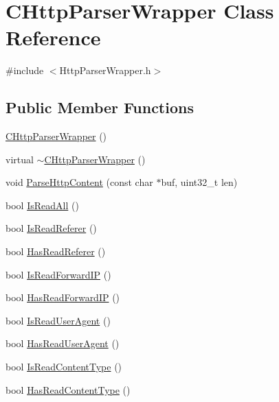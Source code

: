 \hypertarget{class_c_http_parser_wrapper}{}\section{C\+Http\+Parser\+Wrapper Class Reference}
\label{class_c_http_parser_wrapper}


{\ttfamily \#include $<$Http\+Parser\+Wrapper.\+h$>$}

\subsection*{Public Member Functions}
\begin{DoxyCompactItemize}
\item 
\hyperlink{class_c_http_parser_wrapper_a2049e652a14370c7a33c4d8ddbbe070e}{C\+Http\+Parser\+Wrapper} ()
\item 
virtual \hyperlink{class_c_http_parser_wrapper_a859edcf69bb55c5d8a4cbce26cfb53fa}{$\sim$\+C\+Http\+Parser\+Wrapper} ()
\item 
void \hyperlink{class_c_http_parser_wrapper_a163b6568b8f7bbf6e263a8c403407b4f}{Parse\+Http\+Content} (const char $\ast$buf, uint32\+\_\+t len)
\item 
bool \hyperlink{class_c_http_parser_wrapper_a6317df2e1c61752060f4853fed0d8e5b}{Is\+Read\+All} ()
\item 
bool \hyperlink{class_c_http_parser_wrapper_aa72b44a6fb86ae3131dc4af01fe3ad29}{Is\+Read\+Referer} ()
\item 
bool \hyperlink{class_c_http_parser_wrapper_ac78ed3db55eade31ae48cbbf1f13defa}{Has\+Read\+Referer} ()
\item 
bool \hyperlink{class_c_http_parser_wrapper_ace83bc953d56ef9495a573e5ae3b6551}{Is\+Read\+Forward\+I\+P} ()
\item 
bool \hyperlink{class_c_http_parser_wrapper_ae5cd1d99cea2c048508ef4bc10ef4f38}{Has\+Read\+Forward\+I\+P} ()
\item 
bool \hyperlink{class_c_http_parser_wrapper_a7533bab5e22b1cc8b8043347eca64ced}{Is\+Read\+User\+Agent} ()
\item 
bool \hyperlink{class_c_http_parser_wrapper_a89d61d176573b8150445f12d175c3488}{Has\+Read\+User\+Agent} ()
\item 
bool \hyperlink{class_c_http_parser_wrapper_abdd8e317ea7129f7ec4947cb60dc1183}{Is\+Read\+Content\+Type} ()
\item 
bool \hyperlink{class_c_http_parser_wrapper_a4a33df7e6bbbf7b6b68c175f0c0764db}{Has\+Read\+Content\+Type} ()

\end{DoxyCompactItemize}
